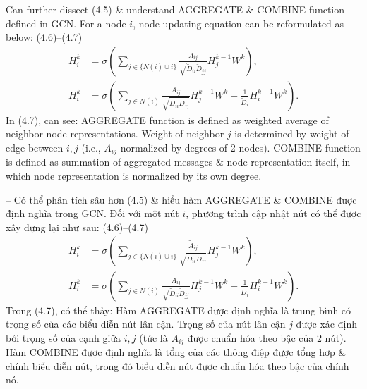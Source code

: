 \documentclass{article}
\begin{document}
\begin{itemize}
\begin{itemize}
\begin{itemize}
            Can further dissect (4.5) \& understand AGGREGATE \& COMBINE function defined in GCN. For a node $i$, node updating equation can be reformulated as below: (4.6)--(4.7)
            \begin{align*}
                H_i^k &= \sigma\left(\sum_{j\in\{N(i)\cup i\}} \frac{\tilde{A}_{ij}}{\sqrt{\tilde{D}_{ii}\tilde{D}_{jj}}}H_j^{k-1}W^k\right),\\
                H_i^k &= \sigma\left(\sum_{j\in N(i)} \frac{A_{ij}}{\sqrt{\tilde{D}_{ii}\tilde{D}_{jj}}}H_j^{k-1}W^k + \frac{1}{\tilde{D}_i}H_i^{k-1}W^k\right).
            \end{align*}
            In (4.7), can see: AGGREGATE function is defined as weighted average of neighbor node representations. Weight of neighbor $j$ is determined by weight of edge between $i,j$ (i.e., $A_{ij}$ normalized by degrees of 2 nodes). COMBINE function is defined as summation of aggregated messages \& node representation itself, in which node representation is normalized by its own degree.

            -- Có thể phân tích sâu hơn (4.5) \& hiểu hàm AGGREGATE \& COMBINE được định nghĩa trong GCN. Đối với một nút $i$, phương trình cập nhật nút có thể được xây dựng lại như sau: (4.6)--(4.7)
            \begin{align*}
                H_i^k &= \sigma\left(\sum_{j\in\{N(i)\cup i\}} \frac{\tilde{A}_{ij}}{\sqrt{\tilde{D}_{ii}\tilde{D}_{jj}}}H_j^{k-1}W^k\right),\\
                H_i^k &= \sigma\left(\sum_{j\in N(i)} \frac{A_{ij}}{\sqrt{\tilde{D}_{ii}\tilde{D}_{jj}}}H_j^{k-1}W^k + \frac{1}{\tilde{D}_i}H_i^{k-1}W^k\right).
            \end{align*}
            Trong (4.7), có thể thấy: Hàm AGGREGATE được định nghĩa là trung bình có trọng số của các biểu diễn nút lân cận. Trọng số của nút lân cận $j$ được xác định bởi trọng số của cạnh giữa $i,j$ (tức là $A_{ij}$ được chuẩn hóa theo bậc của 2 nút). Hàm COMBINE được định nghĩa là tổng của các thông điệp được tổng hợp \& chính biểu diễn nút, trong đó biểu diễn nút được chuẩn hóa theo bậc của chính nó.


\end{itemize}
\end{itemize}
\end{itemize}
\end{document}

